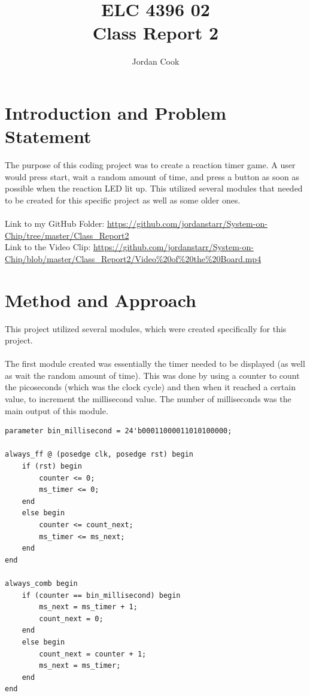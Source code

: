 \documentclass[11pt]{article}
\begin{document}
\title{ELC 4396 02 \\ Class Report 2}
\author{Jordan Cook}

\maketitle


\section*{Introduction and Problem Statement} 

The purpose of this coding project was to create a reaction timer game. A user would press start, wait a random amount of time, and press a button as soon as possible when the reaction LED lit up. This utilized several modules that needed to be created for this specific project as well as some older ones. 
\\\\ Link to my GitHub Folder: \url{https://github.com/jordanstarr/System-on-Chip/tree/master/Class_Report2}
\\ Link to the Video Clip: \url{https://github.com/jordanstarr/System-on-Chip/blob/master/Class_Report2/Video%20of%20the%20Board.mp4}

\section*{Method and Approach}

This project utilized several modules, which were created specifically for this project. 
\\\\
The first module created was essentially the timer needed to be displayed (as well as wait the random amount of time). This was done by using a counter to count the picoseconds (which was the clock cycle) and then when it reached a certain value, to increment the millisecond value. The number of milliseconds was the main output of this module. 

\begin{lstlisting}[style=Verilog,caption=Timer Module Code,label=code:ex ]
parameter bin_millisecond = 24'b00011000011010100000;

always_ff @ (posedge clk, posedge rst) begin 
	if (rst) begin
		counter <= 0; 
		ms_timer <= 0; 
	end 
	else begin
		counter <= count_next; 
		ms_timer <= ms_next;
	end   
end

always_comb begin 
	if (counter == bin_millisecond) begin 
		ms_next = ms_timer + 1; 
		count_next = 0;
	end
	else begin  
		count_next = counter + 1; 
		ms_next = ms_timer;
	end
end
\end{lstlisting}
 
\end{document}
